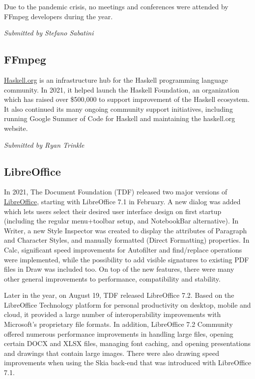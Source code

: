 \documentclass[a4paper]{report}
\begin{document}
Due to the pandemic crisis, no meetings and conferences were attended by FFmpeg developers during the year.

{\em Submitted by Stefano Sabatini}

\subsection{FFmpeg}

\href{https://www.haskell.org/}{Haskell.org} is an infrastructure hub for the Haskell programming language community. In 2021, it helped launch the Haskell Foundation, an organization which has raised over \$500,000 to support improvement of the Haskell ecosystem. It also continued its many ongoing community support initiatives, including running Google Summer of Code for Haskell and maintaining the haskell.org website.

{\em Submitted by Ryan Trinkle}

\subsection{LibreOffice}

In 2021, The Document Foundation (TDF) released two major versions of \href{https://www.libreoffice.org/}{LibreOffice}, starting with LibreOffice 7.1 in February. A new dialog was added which lets users select their desired user interface design on first startup (including the regular menu+toolbar setup, and NotebookBar alternative). In Writer, a new Style Inspector was created to display the attributes of Paragraph and Character Styles, and manually formatted (Direct Formatting) properties. In Calc, significant speed improvements for Autofilter and find/replace operations were implemented, while the possibility to add visible signatures to existing PDF files in Draw was included too. On top of the new features, there were many other general improvements to performance, compatibility and stability.

Later in the year, on August 19, TDF released LibreOffice 7.2. Based on the LibreOffice Technology platform for personal productivity on desktop, mobile and cloud, it provided a large number of interoperability improvements with Microsoft's proprietary file formats. In addition, LibreOffice 7.2 Community offered numerous performance improvements in handling large files, opening certain DOCX and XLSX files, managing font caching, and opening presentations and drawings that contain large images. There were also drawing speed improvements when using the Skia back-end that was introduced with LibreOffice 7.1.
\end{document}
